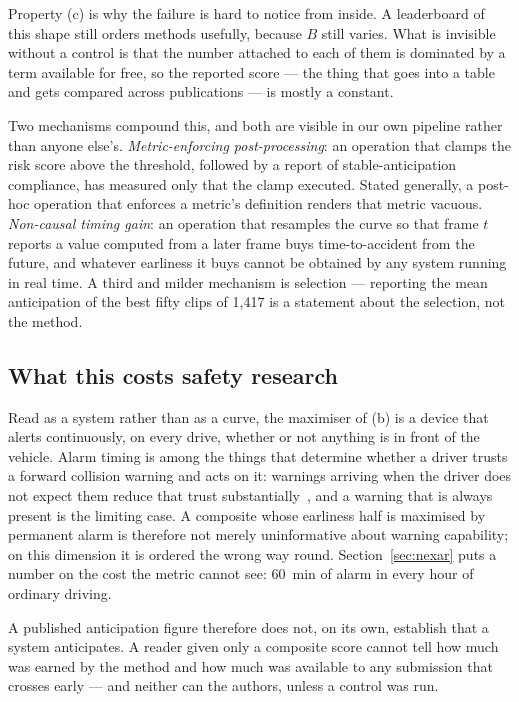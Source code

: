 Property (c) is why the failure is hard to notice from inside. A leaderboard of
this shape still orders methods usefully, because $B$ still varies. What is
invisible without a control is that the number attached to each of them is
dominated by a term available for free, so the reported score --- the thing
that goes into a table and gets compared across publications --- is mostly a
constant.

Two mechanisms compound this, and both are visible in our own pipeline rather
than anyone else's. \emph{Metric-enforcing post-processing}: an operation that
clamps the risk score above the threshold, followed by a report of
stable-anticipation compliance, has measured only that the clamp executed.
Stated generally, a post-hoc operation that enforces a metric's definition
renders that metric vacuous. \emph{Non-causal timing gain}: an operation that
resamples the curve so that frame $t$ reports a value computed from a later
frame buys time-to-accident from the future, and whatever earliness it buys
cannot be obtained by any system running in real time. A third and milder
mechanism is selection --- reporting the mean anticipation of the best fifty
clips of 1{,}417 is a statement about the selection, not the method.

\subsection{What this costs safety research}

Read as a system rather than as a curve, the maximiser of (b) is a device that
alerts continuously, on every drive, whether or not anything is in front of the
vehicle. Alarm timing is among the things that determine whether a driver
trusts a forward collision warning and acts on it: warnings arriving when the
driver does not expect them reduce that trust
substantially~\cite{abe2006alarm}, and a warning that is always present is the
limiting case. A composite whose earliness half is maximised by permanent alarm
is therefore not merely uninformative about warning capability; on this
dimension it is ordered the wrong way round. Section~\ref{sec:nexar} puts a
number on the cost the metric cannot see: \SI{60}{\minute} of alarm in every
hour of ordinary driving.

A published anticipation figure therefore does not, on its own, establish that
a system anticipates. A reader given only a composite score cannot tell how
much was earned by the method and how much was available to any submission that
crosses early --- and neither can the authors, unless a control was run.

